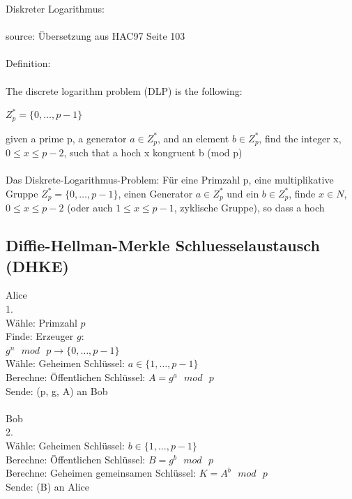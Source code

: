 \documentclass[
  a4paper,
  11pt,
]{article}
\title{}
\author{}
\begin{document}
Diskreter Logarithmus:
\\\\
source: Übersetzung aus HAC97 Seite 103
\\\\
Definition:
\\\\
The discrete logarithm problem (DLP) is the following:


$Z_p^* = \{ 0 ,\ldots , p - 1 \}$

given a prime p, a generator ${a\in Z_p^*}$, and an element ${b\in Z_p^*}$,
find the integer x, $0\leq x\leq p-2$, such that
a hoch x kongruent b (mod p)
\\\\
Das Diskrete-Logarithmus-Problem:
Für eine Primzahl p, eine multiplikative Gruppe $Z_p^* = \{ 0 ,\ldots , p - 1 \}$, einen Generator ${a\in Z_p^*}$ und ein ${b\in Z_p^*}$,
finde ${x\in N}$, $0\leq x\leq p-2$ (oder auch $1\leq x\le p-1$, zyklische Gruppe),
so dass a hoch %

\subsection*{Diffie-Hellman-Merkle Schluesselaustausch (DHKE)}
\label{sub:Diffie-Hellman-Merkle Schluesselaustausch (DHKE)}

	Alice\\
	1.\\
	Wähle:	Primzahl $p$\\
	Finde:	Erzeuger $g$:\\
			$g^n\text{ }mod\text{ }p \rightarrow \{ 0 ,\ldots , p - 1 \}$\\
	Wähle:	Geheimen Schlüssel: $a\in \{ 1 ,\ldots , p - 1 \}$\\
	Berechne:	Öffentlichen Schlüssel: $A=g^a\text{ }mod\text{ }p$\\
	Sende: (p, g, A) an Bob\\\\

	Bob\\
	2.\\
	Wähle:	Geheimen Schlüssel: $b\in \{ 1 ,\ldots , p - 1 \}$\\
	Berechne:	Öffentlichen Schlüssel: $B=g^b\text{ }mod\text{ }p$\\
	Berechne:	Geheimen gemeinsamen Schlüssel: $K=A^b\text{ }mod\text{ }p$\\
	Sende: (B) an Alice\\\\
	
\end{document}
